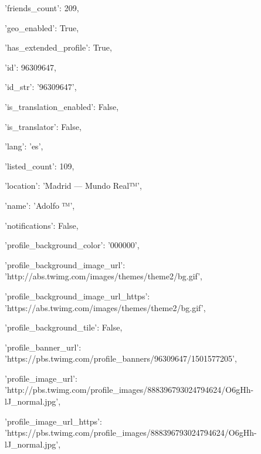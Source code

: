 \hspace{1.7cm}'friends\_count': 209,

\hspace{1.7cm}'geo\_enabled': True,

\hspace{1.7cm}'has\_extended\_profile': True,

\hspace{1.7cm}'id': 96309647,

\hspace{1.7cm}'id\_str': '96309647',

\hspace{1.7cm}'is\_translation\_enabled': False,

\hspace{1.7cm}'is\_translator': False,

\hspace{1.7cm}'lang': 'es',

\hspace{1.7cm}'listed\_count': 109,

\hspace{1.7cm}'location': 'Madrid — Mundo Real™',

\hspace{1.7cm}'name': 'Adolfo ™',

\hspace{1.7cm}'notifications': False,

\hspace{1.7cm}'profile\_background\_color': '000000',

\hspace{1.7cm}'profile\_background\_image\_url': 'http://abs.twimg.com/images/themes/theme2/bg.gif',

\hspace{1.7cm}'profile\_background\_image\_url\_https': 'https://abs.twimg.com/images/themes/theme2/bg.gif',

\hspace{1.7cm}'profile\_background\_tile': False,

\hspace{1.7cm}'profile\_banner\_url': 'https://pbs.twimg.com/profile\_banners/96309647/1501577205',

\hspace{1.7cm}'profile\_image\_url': 'http://pbs.twimg.com/profile\_images/888396793024794624/O6gHh-lJ\_normal.jpg',

\hspace{1.7cm}'profile\_image\_url\_https': 'https://pbs.twimg.com/profile\_images/888396793024794624/O6gHh-lJ\_normal.jpg',

